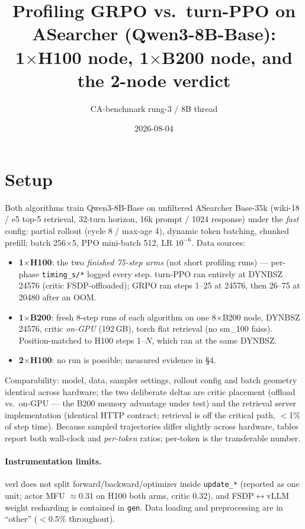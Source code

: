\documentclass[10pt]{article}
\title{\vspace{-1.2em}Profiling GRPO vs.\ turn-PPO on ASearcher (Qwen3-8B-Base):\\
1$\times$H100 node, 1$\times$B200 node, and the 2-node verdict}
\author{CA-benchmark rung-3 / 8B thread}
\date{2026-08-04}
\newcommand{\hw}[1]{\textbf{#1}}
\begin{document}
\maketitle
\vspace{-2em}

\section*{Setup}
Both algorithms train Qwen3-8B-Base on unfiltered ASearcher Base-35k (wiki-18 / e5 top-5
retrieval, 32-turn horizon, 16k prompt / 1024 response) under the \emph{fast} config:
partial rollout (cycle 8 / max-age 4), dynamic token batching, chunked prefill;
batch 256$\times$5, PPO mini-batch 512, LR $10^{-6}$. Data sources:
\begin{itemize}\itemsep2pt
  \item \hw{1$\times$H100}: the two \emph{finished 75-step arms} (not short profiling runs) —
  per-phase \texttt{timing\_s/*} logged every step. turn-PPO ran entirely at DYNBSZ 24576
  (critic FSDP-offloaded); GRPO ran steps 1--25 at 24576, then 26--75 at 20480 after an OOM.
  \item \hw{1$\times$B200}: fresh 8-step runs of each algorithm on one 8$\times$B200 node,
  DYNBSZ 24576, critic \emph{on-GPU} (192\,GB), torch flat retrieval (no sm\_100 faiss).
  Position-matched to H100 steps 1--$N$, which ran at the same DYNBSZ.
  \item \hw{2$\times$H100}: no run is possible; measured evidence in \S4.
\end{itemize}
Comparability: model, data, sampler settings, rollout config and batch geometry identical
across hardware; the two deliberate deltas are critic placement (offload vs.\ on-GPU — the
B200 memory advantage under test) and the retrieval server implementation (identical HTTP
contract; retrieval is off the critical path, $<$1\% of step time). Because sampled
trajectories differ slightly across hardware, tables report both wall-clock and
\emph{per-token} ratios; per-token is the transferable number.

\paragraph{Instrumentation limits.} verl does not split forward/backward/optimizer inside
\texttt{update\_*} (reported as one unit; actor MFU $\approx$0.31 on H100 both arms, critic
0.32), and FSDP$\leftrightarrow$vLLM weight resharding is contained in \texttt{gen}.
Data loading and preprocessing are in ``other'' ($<$0.5\% throughout).
\end{document}
